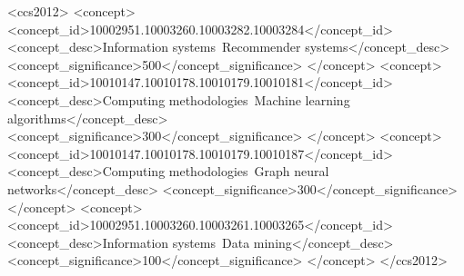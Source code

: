 \documentclass[sigconf]{acmart}
\begin{document}
\begin{CCSXML}
<ccs2012>
 <concept>
  <concept_id>10002951.10003260.10003282.10003284</concept_id>
  <concept_desc>Information systems~Recommender systems</concept_desc>
  <concept_significance>500</concept_significance>
 </concept>
 <concept>
  <concept_id>10010147.10010178.10010179.10010181</concept_id>
  <concept_desc>Computing methodologies~Machine learning algorithms</concept_desc>
  <concept_significance>300</concept_significance>
 </concept>
 <concept>
  <concept_id>10010147.10010178.10010179.10010187</concept_id>
  <concept_desc>Computing methodologies~Graph neural networks</concept_desc>
  <concept_significance>300</concept_significance>
 </concept>
 <concept>
  <concept_id>10002951.10003260.10003261.10003265</concept_id>
  <concept_desc>Information systems~Data mining</concept_desc>
  <concept_significance>100</concept_significance>
 </concept>
</ccs2012>
\end{CCSXML}



\maketitle
\end{document}
